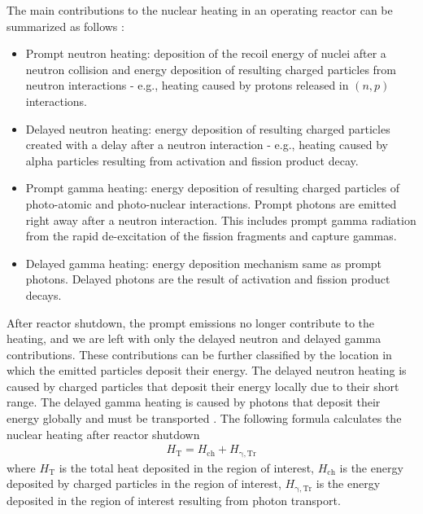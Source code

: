 \documentclass{style/nseJournal}
\begin{document}
The main contributions to the nuclear heating in an operating reactor can be summarized as follows \cite{lemaire_estimation_2015}:
\begin{itemize}
  \item Prompt neutron heating: deposition of the recoil energy of nuclei after a neutron collision and energy deposition of resulting charged particles from neutron interactions - e.g., heating caused by protons released in $(n,p)$ interactions.
  \item Delayed neutron heating: energy deposition of resulting charged particles created with a delay after a neutron interaction - e.g., heating caused by alpha particles resulting from activation and fission product decay.
  \item Prompt gamma heating: energy deposition of resulting charged particles of photo-atomic and photo-nuclear interactions. Prompt photons are emitted right away after a neutron interaction. This includes prompt gamma radiation from the rapid de-excitation of the fission fragments and capture gammas.
  \item Delayed gamma heating: energy deposition mechanism same as prompt photons. Delayed photons are the result of activation and fission product decays.
\end{itemize}

After reactor shutdown, the prompt emissions no longer contribute to the heating, and we are left with only the delayed neutron and delayed gamma contributions.
These contributions can be further classified by the location in which the emitted particles deposit their energy.
The delayed neutron heating is caused by charged particles that deposit their energy locally due to their short range.
The delayed gamma heating is caused by photons that deposit their energy globally and must be transported \cite{peterson-droogh_current_2018}.
The following formula calculates the nuclear heating after reactor shutdown
\begin{align}
H_{\mathrm{T}} = H_{\mathrm{ch}} + H_{\mathrm{\gamma, Tr}} \label{eq:heat}
\end{align}
where $H_{\mathrm{T}}$ is the total heat deposited in the region of interest, $H_{\mathrm{ch}}$ is the energy deposited by charged particles in the region of interest, $H_{\mathrm{\gamma, Tr}}$ is the energy deposited in the region of interest resulting from photon transport.
\end{document}
